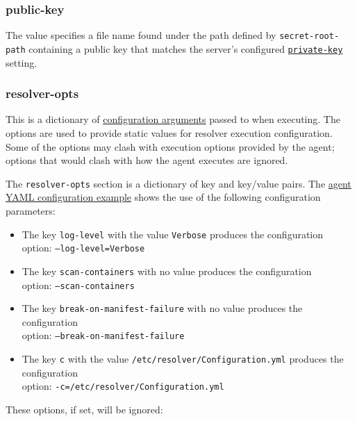 \subsubsection{public-key}\label{sec:agent-public-key}
The value specifies a file name found under the path defined by \texttt{secret-root-path} containing a 
public key that matches the server's configured \hyperref[sec:yaml-resolver-private-key]{\texttt{private-key}} setting.

\subsubsection{resolver-opts}\label{sec:agent-resolver-opts}
This is a dictionary of
\href{https://docs.checkmarx.com/en/34965-132888-checkmarx-sca-resolver-configuration-arguments.html#UUID-bc93274b-c1c7-ea47-9556-3bd8900711dc_id_CheckmarxSCAResolverConfigurationArguments-ConfigurationArguments-TablesandSamples}{configuration arguments}
passed to \scaresolver when executing.  The options are used to provide static values for resolver execution configuration.  Some of the
options may clash with execution options provided by the agent; options that would clash with how the agent executes \scaresolver are ignored.  

The \texttt{resolver-opts} section is a dictionary of key and key/value pairs. The \hyperref[code:agent-yaml-example]{agent YAML configuration example}
shows the use of the following \scaresolver configuration parameters:

\begin{itemize}
  \item The key \texttt{log-level} with the value \texttt{Verbose} produces the configuration\\option: \texttt{--log-level=Verbose}
  \item The key \texttt{scan-containers} with no value produces the configuration\\option: \texttt{--scan-containers}
  \item The key \texttt{break-on-manifest-failure} with no value produces the configuration\\option: \texttt{--break-on-manifest-failure}
  \item The key \texttt{c} with the value \texttt{/etc/resolver/Configuration.yml} produces the configuration\\option: \texttt{-c=/etc/resolver/Configuration.yml}
\end{itemize}


These options, if set, will be ignored:

